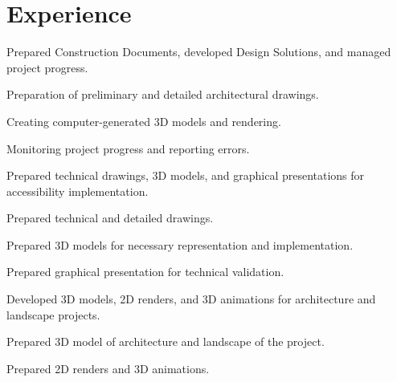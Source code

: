 \section{Experience}

\betweenProjectsVSpace
{}
\betweenSummaryPointsVSpace
Prepared Construction Documents, developed Design Solutions, and managed project progress.

\begin{tightemize}
\item Preparation of preliminary and detailed architectural drawings.
\item Creating computer-generated 3D models and rendering.
\item Monitoring project progress and reporting errors.
\end{tightemize}

\betweenProjectsVSpace
{}
\betweenSummaryPointsVSpace
Prepared technical drawings, 3D models, and graphical presentations for accessibility implementation.

\begin{tightemize}
\item Prepared technical and detailed drawings.
\item Prepared 3D models for necessary representation and implementation.
\item Prepared graphical presentation for technical validation.
\end{tightemize}

\betweenProjectsVSpace
{}
\betweenSummaryPointsVSpace
Developed 3D models, 2D renders, and 3D animations for architecture and landscape projects.

\begin{tightemize}
\item Prepared 3D model of architecture and landscape of the project.
\item Prepared 2D renders and 3D animations.
\end{tightemize}

